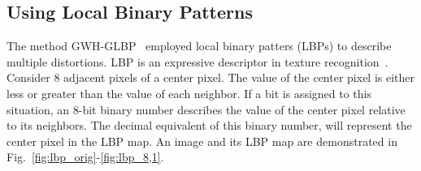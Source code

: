 \subsection{Using Local Binary Patterns}
The method GWH-GLBP~\cite{Li2016} employed local binary patters (LBPs) to describe multiple distortions. LBP is an expressive descriptor in texture recognition~\cite{Ojala2002}. Consider 8 adjacent pixels of a center pixel. The value of the center pixel is either less or greater than the value of each neighbor. If a bit is assigned to this situation, an 8-bit binary number describes the value of the center pixel relative to its neighbors. The decimal equivalent of this binary number, will represent the center pixel in the LBP map. An image and its LBP map are demonstrated in Fig.~\ref{fig:lbp_orig}-\ref{fig:lbp_8,1}.
